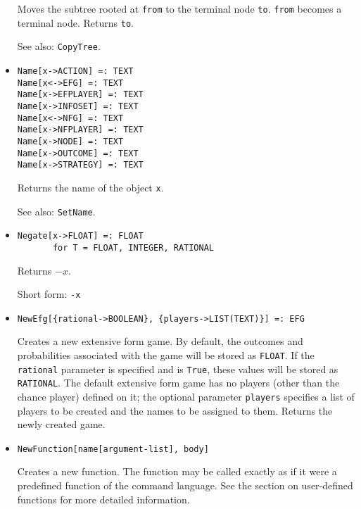 \begin{itemize}
\bd
Moves the subtree rooted at \verb+from+ to
the terminal node \verb+to+.  \verb+from+ becomes a terminal node.
Returns \verb+to+.
\item
[See also:] {\tt CopyTree}.
\ed


\item
\protect \large \begin{verbatim}
Name[x->ACTION] =: TEXT
Name[x<->EFG] =: TEXT
Name[x->EFPLAYER] =: TEXT
Name[x->INFOSET] =: TEXT
Name[x<->NFG] =: TEXT
Name[x->NFPLAYER] =: TEXT
Name[x->NODE] =: TEXT
Name[x->OUTCOME] =: TEXT
Name[x->STRATEGY] =: TEXT
\end{verbatim}\normalsize

\bd
Returns the name of the object \verb+x+.
\item
[See also:] {\tt SetName}.
\ed

\item 
\protect \large \begin{verbatim}
Negate[x->FLOAT] =: FLOAT
       for T = FLOAT, INTEGER, RATIONAL
\end{verbatim} \normalsize

\bd
Returns $-x$.
\item
[Short form:] \verb+-x+
\ed


\item
\protect \large \begin{verbatim} 
NewEfg[{rational->BOOLEAN}, {players->LIST(TEXT)}] =: EFG
\end{verbatim}\normalsize

\bd
Creates a new extensive form game.  By default, the
outcomes and probabilities associated with the game will be stored as
{\tt FLOAT}.  If the \verb+rational+ parameter is specified and is \verb+True+,
these values will be stored as {\tt RATIONAL}.  The default extensive form
game has no players (other than the chance player) defined on it; the
optional parameter \verb+players+ specifies a list of players to be
created and the names to be assigned to them.  Returns the newly created
game.
\ed

\item   
\protect \large \begin{verbatim}
NewFunction[name[argument-list], body]
\end{verbatim}\normalsize

\bd
Creates a new function.  The function may be called exactly
as if it were a predefined function of the command language.  See the
section on user-defined functions for more detailed information.
\ed


\end{itemize}
